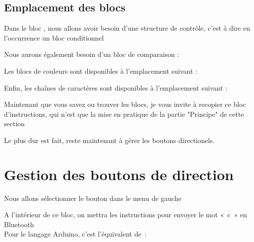 \subsection{Emplacement des blocs}


Dans le bloc , nous allons avoir besoin d'une structure de contrôle, c'est à dire en l'occurrence un bloc conditionnel 



Nous aurons également besoin d'un bloc de comparaison : 



Les blocs de couleurs sont disponibles à l'emplacement suivant : 



Enfin, les chaînes de caractères sont disponibles à l'emplacement suivant : 




Maintenant que vous savez ou trouver les blocs, je vous invite à recopier ce bloc d'instructions, qui n'est que la mise en pratique de la partie "Principe" de cette section


Le plus dur est fait, reste maintenant à gérer les boutons directionels.

\section{Gestion des boutons de direction}

Nous allons sélectionner le bouton  dans le menu de gauche

 A l'intérieur de ce bloc, on mettra les instructions pour envoyer le mot « c » en Bluetooth \\
Pour le langage Arduino, c'est l'équivalent de :

